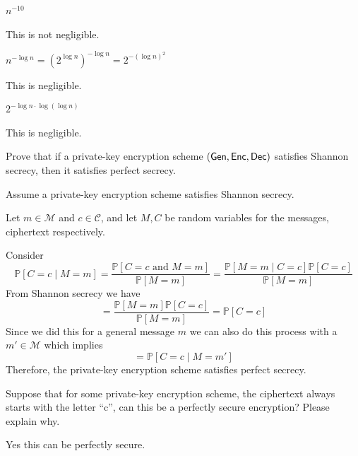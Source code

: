 \documentclass[12pt, letterpaper]{article}
\renewcommand{\P}{\mathbb{P}}
\renewcommand{\t}[1]{\text{#1}}
\newcommand{\skcgen}{{\sf Gen}} \newcommand{\skcenc}{{\sf Enc}}
\newcommand{\skcdec}{{\sf Dec}}
\begin{document}
\begin{subproblem}{}
    $n^{-10}$
\end{subproblem}
\begin{solution}
    This is not negligible.
\end{solution}

\begin{subproblem}{}
    $n^{-\log n}=(2^{\log n})^{- \log n}= 2^{-(\log n)^2}$
\end{subproblem}
\begin{solution}
    This is negligible.
\end{solution}

\begin{subproblem}{}
    $2^{-\log n \cdot \log( \log n)}$
\end{subproblem}
\begin{solution}
    This is negligible.
\end{solution}

\begin{problem}{}
    Prove that if a private-key encryption scheme $(\skcgen,\skcenc,\skcdec)$ satisfies Shannon secrecy, then it satisfies perfect secrecy.
\end{problem}
\begin{problemproof}
    Assume a private-key encryption scheme satisfies Shannon secrecy.

    Let $m \in \mathcal{M}$ and $c \in \mathcal{C}$, and let $M,C$ be random variables for the messages, ciphertext respectively.

    Consider
    \[\P[C = c \mid M = m] = \frac{\P[C=c \t{ and } M=m]}{\P[M=m]}=\frac{\P[M=m \mid C=c]\P[C=c]}{\P[M=m]}\]
    From Shannon secrecy we have
    \[=\frac{\P[M=m]\P[C=c]}{\P[M=m]}=\P[C=c]\]
    Since we did this for a general message $m$ we can also do this process with a $m' \in \mathcal{M}$ which implies
    \[=\P[C = c \mid M= m']\]
    Therefore, the private-key encryption scheme satisfies perfect secrecy.
\end{problemproof}

\qh
\begin{subproblem}{}
    Suppose that for some private-key encryption scheme,
the ciphertext always starts with the letter ``c'', 
can this be a perfectly secure encryption?
Please explain why.
\end{subproblem}
Yes this can be perfectly secure.
\end{document}
